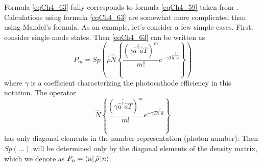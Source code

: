 Formula \eqref{eqCh4_63} fully corresponds to formula
\eqref{eqCh4_59} taken from \cite{bLoudon1976}. Calculations using
formula \eqref{eqCh4_63} are somewhat 
more complicated than using Mandel's formula. As an example, let's consider a few
simple cases. First, consider single-mode states. Then
\eqref{eqCh4_63} can be written as 
\[
P_m = Sp\left(
\hat{\rho}
\hat{N}
\left\{
\frac{\left(\gamma \overline{\hat{a}^{\dag} \hat{a}} T\right)^m}{m!}
e^{- \gamma T \overline{\hat{a}^{\dag} \hat{a}}}
\right\}
\right)
\]
where $\gamma$ is a coefficient characterizing the photocathode
efficiency in this notation. The operator 
\[
\hat{N}
\left\{
\frac{\left(\gamma \overline{\hat{a}^{\dag} \hat{a}} T\right)^m}{m!}
e^{- \gamma T \overline{\hat{a}^{\dag} \hat{a}}}
\right\}
\]
has only diagonal elements in the number representation (photon number). Then $Sp\left(\dots\right)$ will be determined
only by the diagonal elements of the density matrix, which we denote as $P_n = \bra{n}\hat{\rho}\ket{n}$.

